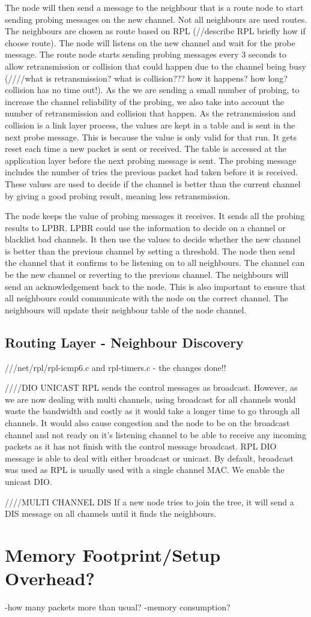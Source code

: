 The node will then send a message to the neighbour that is a route node to start sending probing messages on the new channel. Not all neighbours are used routes. The neighbours are chosen as route based on RPL (//describe RPL briefly how if choose route). The node will listens on the new channel and wait for the probe message. The route node starts sending probing messages every 3 seconds to allow retransmission or collision that could happen due to the channel being busy (////what is retransmission? what is collision??? how it happens? how long? collision has no time out!). As the we are sending a small number of probing, to increase the channel reliability of the probing, we also take into account the number of retransmission and collision that happen. As the retransmission and collision is a link layer process, the values are kept in a table and is sent in the next probe message. This is because the value is only valid for that run. It gets reset each time a new packet is sent or received. The table is accessed at the application layer before the next probing message is sent. The probing message includes the number of tries the previous packet had taken before it is received. These values are used to decide if the channel is better than the current channel by giving a good probing result, meaning less retransmission.

The node keeps the value of probing messages it receives. It sends all the probing results to LPBR. LPBR could use the information to decide on a channel or blacklist bad channels. It then use the values to decide whether the new channel is better than the previous channel by setting a threshold. The node then send the channel that it confirms to be listening on to all neighbours. The channel can be the new channel or reverting to the previous channel. The neighbours will send an acknowledgement back to the node. This is also important to ensure that all neighbours could communicate with the node on the correct channel. The neighbours will update their neighbour table of the node channel. 


\subsection{Routing Layer - Neighbour Discovery}
///net/rpl/rpl-icmp6.c and rpl-timers.c - the changes done!!

////DIO UNICAST
RPL sends the control messages as broadcast. However, as we are now dealing with multi channels, using broadcast for all channels would waste the bandwidth and costly as it would take a longer time to go through all channels. It would also cause congestion and the node to be on the broadcast channel and not ready on it's listening channel to be able to receive any incoming packets as it has not finish with the control message broadcast. RPL DIO message is able to deal with either broadcast or unicast. By default, broadcast was used as RPL is usually used with a single channel MAC. We enable the unicast DIO.

////MULTI CHANNEL DIS
If a new node tries to join the tree, it will send a DIS message on all channels until it finds the neighbours. 

\section{Memory Footprint/Setup Overhead?}
-how many packets more than usual?
-memory consumption?